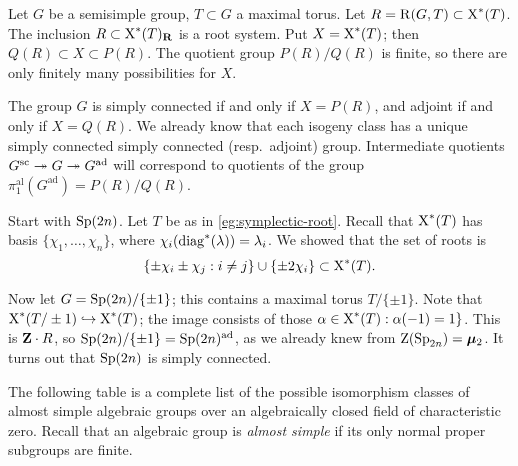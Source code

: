 Let $G$ be a semisimple group, $T\subset G$ a maximal torus. Let 
$R=\operatorname{R}(G,T)\subset \operatorname{X}^\ast(T)$. The inclusion 
$R\subset \operatorname{X}^\ast(T)_{\mathbf{R}}$ is a root system. Put 
$X=\operatorname{X}^\ast(T)$; then $Q(R)\subset X\subset P(R)$. The quotient group 
$P(R)/Q(R)$ is finite, so there are only finitely many possibilities for $X$. 

The group $G$ is simply connected if and only if $X=P(R)$, and adjoint if and 
only if $X=Q(R)$. We already know that each isogeny class has a unique simply 
connected simply connected (resp.~adjoint) group. Intermediate quotients 
$G^\mathrm{sc}\twoheadrightarrow G\twoheadrightarrow G^\mathrm{ad}$ will correspond to quotients of the 
group $\pi_1^\mathrm{al}(G^\mathrm{ad})=P(R)/Q(R)$. 

\begin{example}
Start with $\operatorname{Sp}(2n)$. Let $T$ be as in \autoref{eg:symplectic-root}. Recall 
that $\operatorname{X}^\ast(T)$ has basis $\{\chi_1,\dots,\chi_n\}$, where 
$\chi_i(\operatorname{diag}^\ast(\lambda))=\lambda_i$. We showed that the set of roots is 
\[
  \{\pm \chi_i\pm \chi_j:i\ne j\}\cup\{\pm 2\chi_i\}\subset \operatorname{X}^\ast(T) .
\]

Now let $G=\operatorname{Sp}(2n)/\{\pm 1\}$; this contains a maximal torus $T/\{\pm 1\}$. 
Note that $\operatorname{X}^\ast(T/\pm 1)\hookrightarrow \operatorname{X}^\ast(T)$; the image 
consists of those $\alpha\in \operatorname{X}^\ast(T):\alpha(-1)=1\}$. This is 
$\mathbf{Z}\cdot R$, so $\operatorname{Sp}(2n)/\{\pm 1\}=\operatorname{Sp}(2n)^\mathrm{ad}$, as we already knew 
from $\operatorname{Z}(\operatorname{Sp}_{2n})=\bm{\mu}_2$. It turns out that $\operatorname{Sp}(2n)$ is simply 
connected. 
\end{example}

The following table is a complete list of the possible isomorphism classes of 
almost simple algebraic groups over an algebraically closed field of 
characteristic zero. Recall that an algebraic group is \emph{almost simple} if 
its only normal proper subgroups are finite. 

